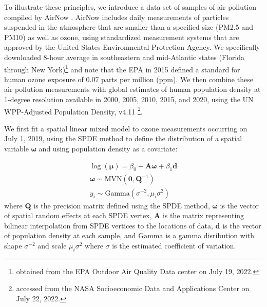 To illustrate these principles, we introduce a data set of samples of air pollution compiled by AirNow \cite{timothy_raw_2004}.  AirNow includes daily measurements of particles suspended in the atmosphere that are smaller than a specified size (PM2.5 and PM10) as well as ozone, using standardized measurement systems that are approved by the United States Environmental Protection Agency.  We specifically downloaded 8-hour average  in southeastern and mid-Atlantic states (Florida through New York)\footnote{obtained from the EPA Outdoor Air Quality Data center on July 19, 2022.} and note that the EPA in 2015 defined a standard for human ozone exposure of 0.07 parts per million (ppm).  We then combine these air pollution measurements with global estimates of human population density at 1-degree resolution available in 2000, 2005, 2010, 2015, and 2020, using the UN WPP-Adjusted Population Density, v4.11 \cite{center_for_international_earth_science_information_networkciesin_gridded_2016}\footnote{accessed from the NASA Socioeconomic Data and Applications Center on July 22, 2022.}.   

We first fit a spatial linear mixed model to ozone measurements occurring on July 1, 2019, using the SPDE method to define the distribution of a spatial variable \( \mathbf{\omega} \) and using population density as a covariate:

\begin{equation} \label{eq:Chap6_ozone}   
\begin{gathered} 
    \log(\mathbf{\mu}) = \beta_0 + \mathbf{A \omega} + \beta_1 \mathbf{d}  \\
    \mathbf{\omega} \sim \mathrm{MVN}( \mathbf{0, Q}^{-1} ) \\
    y_i \sim \mathrm{Gamma}( \sigma^{-2}, \mu_i \sigma^2 )
\end{gathered}
\end{equation}
where \( \mathbf{Q} \) is the precision matrix defined using the SPDE method, \(\mathbf{\omega}\) is the vector of spatial random effects at each SPDE vertex, \( \mathbf{A} \) is the matrix representing bilinear interpolation from SPDE vertices to the locations of data, \(\mathbf{d}\) is the vector of population density at each sample, and \(\mathrm{Gamma}\) is a gamma disribution with shape \( \sigma^{-2} \) and scale \(\mu_i \sigma^2\) where \(\sigma\) is the estimated coefficient of variation.  

